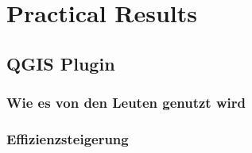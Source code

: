 
\chapter{Practical Results}
		\section{QGIS Plugin}
		\subsection{Wie es von den Leuten genutzt wird}
		\subsection{Effizienzsteigerung}

